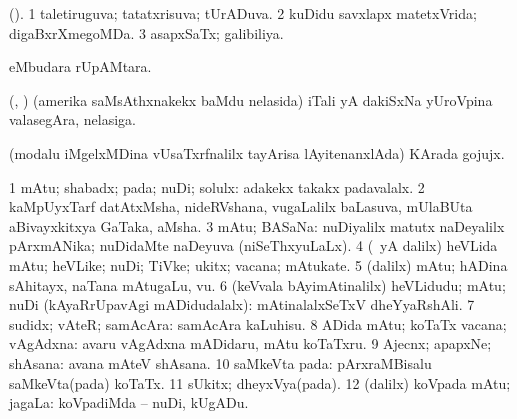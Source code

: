 \bentry
{} 
\gl{\gu}
\bmng
(\AmA). 
\bnum
\num{1} taletiruguva; tatatxrisuva; tUrADuva. 
\num{2} kuDidu savxlapx matetxVrida; digaBxrXmegoMDa. 
\num{3} asapxSaTx; galibiliya. 
\enum
\emng
\eentry

\bentry
{} 
\gl{\sakirx}
\expl{}
\bmng
{} eMbudara rUpAMtara. 
\emng
\eentry

\bentry
{}
\gl{\nA}
\expl{}
\bmng
(\ashi, \hiV) (amerika saMsAthxnakekx baMdu nelasida) iTali yA dakiSxNa yUroVpina valasegAra, nelasiga. 
\emng
\eentry

\bentry
{} 
\gl{\nA}
\expl{}
\bmng
(modalu iMgelxMDina vUsaTxrfnalilx tayArisa lAyitenanxlAda) KArada gojujx. 
\emng
\eentry

\bentry 
{} 
\gl{\saMkiSx}
\expl{}
\bmng
{} 
\emng
\eentry

\bentry
{} 
\gl{\nA}
\expl{}
\bmng
\bnum
\num{1} mAtu; shabadx; pada; nuDi; solulx:  adakekx takakx padavalalx. 
\num{2} kaMpUyxTarf datAtxMsha, nideRVshana, \mo vugaLalilx baLasuva, mUlaBUta aBivayxkitxya GaTaka, aMsha. 
\num{3} mAtu; BASaNa:  nuDiyalilx matutx naDeyalilx pArxmANika; nuDidaMte naDeyuva (niSeThxyuLaLx). 
\num{4} (\bava\ yA \Eva dalilx) heVLida mAtu; heVLike; nuDi; TiVke; ukitx; vacana; mAtukate. 
\num{5} (\bava dalilx) mAtu; hADina sAhitayx, naTana mAtugaLu, \mo vu. 
\num{6} (keVvala bAyimAtinalilx) heVLidudu; mAtu; nuDi (kAyaRrUpavAgi mADidudalalx):  mAtinalalxSeTxV dheYyaRshAli. 
\num{7} sudidx; vAteR; samAcAra:  samAcAra kaLuhisu. 
\num{8} ADida mAtu; koTaTx vacana; vAgAdxna:  avaru vAgAdxna mADidaru, mAtu koTaTxru. 
\num{9} Ajecnx; apapxNe; shAsana:  avana mAteV shAsana. 
\num{10} saMkeVta pada:  pArxraMBisalu saMkeVta(pada) koTaTx. 
\num{11} sUkitx; dheyxVya(pada). 
\num{12} (\bava dalilx) koVpada mAtu; jagaLa:  koVpadiMda -- nuDi, kUgADu. 
\enum
\emng

